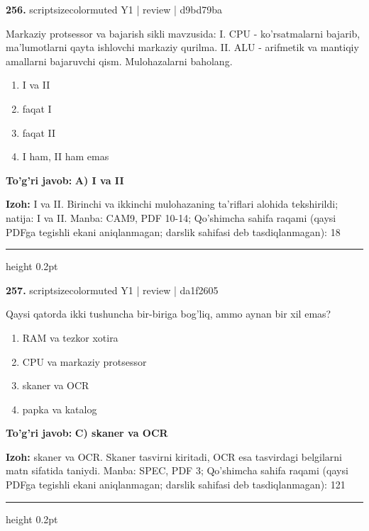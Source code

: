 \documentclass[10pt,a4paper]{article}
\begin{document}
{\bfseries\sffamily\color{ink} 256.} {scriptsizecolor{muted} Y1 | review | d9bd79ba}
\par
Markaziy protsessor va bajarish sikli mavzusida: I. CPU - ko'rsatmalarni bajarib, ma'lumotlarni qayta ishlovchi markaziy qurilma. II. ALU - arifmetik va mantiqiy amallarni bajaruvchi qism. Mulohazalarni baholang.
\begin{enumerate}[label=\Alph*),leftmargin=9mm]
\item I va II
\item faqat I
\item faqat II
\item I ham, II ham emas
\end{enumerate}
\begin{tcolorbox}[enhanced,breakable,colback=teal!4,colframe=teal!60!black,boxrule=0.45pt,arc=1.2mm,left=2.7mm,right=2.7mm,top=1.8mm,bottom=1.8mm,before skip=2mm,after skip=2mm]
{\bfseries\sffamily\color{teal}To'g'ri javob:} \textbf{A) I va II}
\par\smallskip
{\bfseries Izoh:} I va II. Birinchi va ikkinchi mulohazaning ta'riflari alohida tekshirildi; natija: I va II. Manba: CAM9, PDF 10-14; Qo'shimcha sahifa raqami (qaysi PDFga tegishli ekani aniqlanmagan; darslik sahifasi deb tasdiqlanmagan): 18
\end{tcolorbox}
\vspace{2mm}\hrule height 0.2pt\vspace{3mm}

{\bfseries\sffamily\color{ink} 257.} {scriptsizecolor{muted} Y1 | review | da1f2605}
\par
Qaysi qatorda ikki tushuncha bir-biriga bog'liq, ammo aynan bir xil emas?
\begin{enumerate}[label=\Alph*),leftmargin=9mm]
\item RAM va tezkor xotira
\item CPU va markaziy protsessor
\item skaner va OCR
\item papka va katalog
\end{enumerate}
\begin{tcolorbox}[enhanced,breakable,colback=teal!4,colframe=teal!60!black,boxrule=0.45pt,arc=1.2mm,left=2.7mm,right=2.7mm,top=1.8mm,bottom=1.8mm,before skip=2mm,after skip=2mm]
{\bfseries\sffamily\color{teal}To'g'ri javob:} \textbf{C) skaner va OCR}
\par\smallskip
{\bfseries Izoh:} skaner va OCR. Skaner tasvirni kiritadi, OCR esa tasvirdagi belgilarni matn sifatida taniydi. Manba: SPEC, PDF 3; Qo'shimcha sahifa raqami (qaysi PDFga tegishli ekani aniqlanmagan; darslik sahifasi deb tasdiqlanmagan): 121
\end{tcolorbox}
\vspace{2mm}\hrule height 0.2pt\vspace{3mm}
\end{document}
